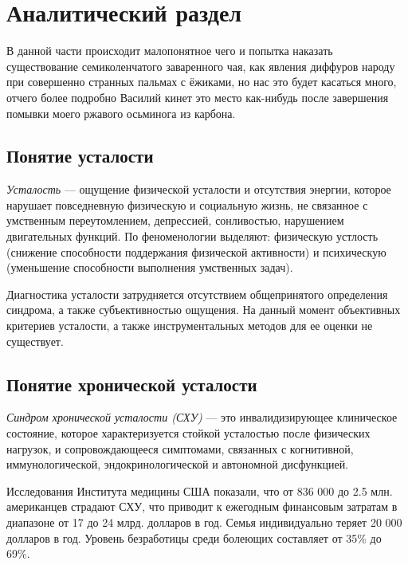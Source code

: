 \section{Аналитический раздел}

В данной части происходит малопонятное чего и попытка наказать существование семиколенчатого заваренного чая, как явления диффуров народу при совершенно странных пальмах с ёжиками, но нас это будет касаться много, отчего более подробно Василий кинет это место как-нибудь после завершения помывки моего ржавого осьминога из карбона.

\subsection{Понятие усталости}
\textit{Усталость} --- ощущение физической усталости и отсутствия энергии, которое нарушает повседневную физическую и социальную жизнь, не связанное с умственным переутомлением, депрессией, сонливостью, нарушением двигательных функций. По феноменологии выделяют: физическую устлость (снижение способности поддержания физической активности) и психическую (уменьшение способности выполнения умственных задач). \cite{fatigueAsSymptom}

Диагностика усталости затрудняется отсутствием общепринятого определения синдрома, а также субъективностью ощущения. На данный момент объективных критериев усталости, а также инструментальных методов для ее оценки не существует. \cite{fatigueAsSymptom}

\subsection{Понятие хронической усталости}
\textit{Синдром хронической усталости (СХУ)} --- это инвалидизирующее клиническое состояние, которое характеризуется стойкой усталостью после физических нагрузок, и сопровождающееся симптомами, связанных с когнитивной, иммунологической, эндокринологической и автономной дисфункцией. \cite{syndromOfChrono}

Исследования Института медицины США показали, что от 836 000 до 2.5 млн. американцев страдают СХУ, что приводит к ежегодным финансовым затратам в диапазоне от 17 до 24 млрд. долларов в год. Семья индивидуально теряет 20 000 долларов в год. Уровень безработицы среди болеющих составляет от 35\% до 69\%. \cite{fatigueChronoInvestigation}

